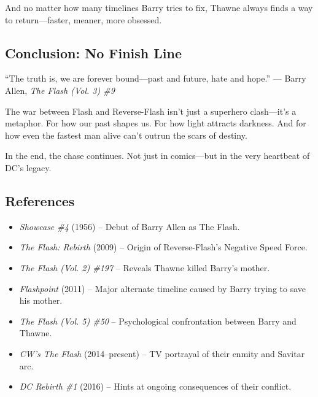 And no matter how many timelines Barry tries to fix, Thawne always finds a way to return---faster, meaner, more obsessed.

\subsection*{Conclusion: No Finish Line}
\begin{magquote}
“The truth is, we are forever bound---past and future, hate and hope.”  
\hfill --- Barry Allen, \textit{The Flash (Vol. 3) \#9}
\end{magquote}

The war between Flash and Reverse-Flash isn’t just a superhero clash---it’s a metaphor. For how our past shapes us. For how light attracts darkness. And for how even the fastest man alive can’t outrun the scars of destiny.

In the end, the chase continues. Not just in comics---but in the very heartbeat of DC’s legacy.

\subsection*{References}
\begin{itemize}
  \item \textit{Showcase \#4} (1956) – Debut of Barry Allen as The Flash.
  \item \textit{The Flash: Rebirth} (2009) – Origin of Reverse-Flash's Negative Speed Force.
  \item \textit{The Flash (Vol. 2) \#197} – Reveals Thawne killed Barry’s mother.
  \item \textit{Flashpoint} (2011) – Major alternate timeline caused by Barry trying to save his mother.
  \item \textit{The Flash (Vol. 5) \#50} – Psychological confrontation between Barry and Thawne.
  \item \textit{CW's The Flash} (2014–present) – TV portrayal of their enmity and Savitar arc.
  \item \textit{DC Rebirth \#1} (2016) – Hints at ongoing consequences of their conflict.
\end{itemize}

\clearpage
\cleardoublepage
